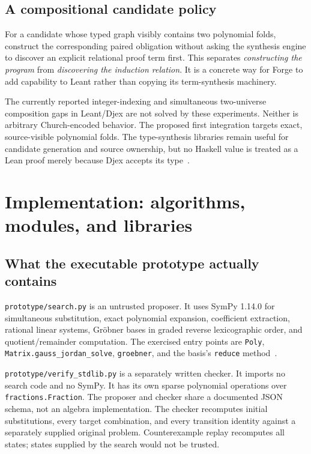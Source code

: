 \documentclass[11pt,letterpaper]{article}
\theoremstyle{definition}
\newcommand{\code}[1]{\nolinkurl{#1}}
\begin{document}
\subsection{A compositional candidate policy}
For a candidate whose typed graph visibly contains two polynomial folds,
construct the corresponding paired obligation without asking the synthesis
engine to discover an explicit relational proof term first. This separates
\emph{constructing the program} from \emph{discovering the induction relation}.
It is a concrete way for Forge to add capability to Leant rather than copying
its term-synthesis machinery.

The currently reported integer-indexing and simultaneous two-universe
composition gaps in Leant/Djex are not solved by these experiments. Neither is
arbitrary Church-encoded behavior. The proposed first integration targets exact,
source-visible polynomial folds. The type-synthesis libraries remain useful for
candidate generation and source ownership, but no Haskell value is treated as a
Lean proof merely because Djex accepts its type~\cite{leant-readme,djex-readme}.

\section{Implementation: algorithms, modules, and libraries}
\label{sec:implementation}

\subsection{What the executable prototype actually contains}
\code{prototype/search.py} is an untrusted proposer. It uses SymPy 1.14.0 for
simultaneous substitution, exact polynomial expansion, coefficient extraction,
rational linear systems, Gr\"obner bases in graded reverse lexicographic order,
and quotient/remainder computation. The exercised entry points are
\code{Poly}, \code{Matrix.gauss_jordan_solve}, \code{groebner}, and the basis's
\code{reduce} method~\cite{sympy}.

\code{prototype/verify_stdlib.py} is a separately written checker. It imports
no search code and no SymPy. It has its own sparse polynomial operations over
\code{fractions.Fraction}. The proposer and checker share a documented JSON
schema, not an algebra implementation. The checker recomputes initial
substitutions, every target combination, and every transition identity against
a separately supplied original problem. Counterexample replay recomputes all
states; states supplied by the search would not be trusted.
\end{document}

